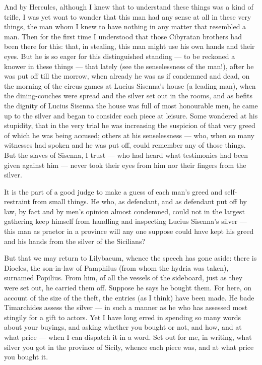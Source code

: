  And by Hercules, although I knew that to understand these things was a kind of trifle, I was yet wont to wonder that this man had any sense at all in these very things, the man whom I knew to have nothing in any matter that resembled a man. Then for the first time I understood that those Cibyratan brothers had been there for this: that, in stealing, this man might use his own hands and their eyes. But he is so eager for this distinguished standing --- to be reckoned a knower in these things --- that lately (see the senselessness of the man!), after he was put off till the morrow, when already he was as if condemned and dead, on the morning of the circus games at Lucius Sisenna's house (a leading man), when the dining-couches were spread and the silver set out in the rooms, and as befits the dignity of Lucius Sisenna the house was full of most honourable men, he came up to the silver and began to consider each piece at leisure. Some wondered at his stupidity, that in the very trial he was increasing the suspicion of that very greed of which he was being accused; others at his senselessness --- who, when so many witnesses had spoken and he was put off, could remember any of those things. But the slaves of Sisenna, I trust --- who had heard what testimonies had been given against him --- never took their eyes from him nor their fingers from the silver.

 It is the part of a good judge to make a guess of each man's greed and self-restraint from small things. He who, as defendant, and as defendant put off by law, by fact and by men's opinion almost condemned, could not in the largest gathering keep himself from handling and inspecting Lucius Sisenna's silver --- this man as praetor in a province will any one suppose could have kept his greed and his hands from the silver of the Sicilians?

 But that we may return to Lilybaeum, whence the speech has gone aside: there is Diocles, the son-in-law of Pamphilus (from whom the hydria was taken), surnamed Popilius. From him, of all the vessels of the sideboard, just as they were set out, he carried them off. Suppose he says he bought them. For here, on account of the size of the theft, the entries (as I think) have been made. He bade Timarchides assess the silver --- in such a manner as he who has assessed most stingily for a gift to actors. Yet I have long erred in spending so many words about your buyings, and asking whether you bought or not, and how, and at what price --- when I can dispatch it in a word. Set out for me, in writing, what silver you got in the province of Sicily, whence each piece was, and at what price you bought it.


